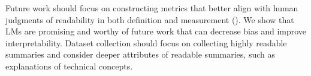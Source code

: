 Future work should focus on constructing metrics that better align with human judgments of readability in both definition and measurement (). We show that LMs are promising and worthy of future work that can decrease bias and improve interpretability. Dataset collection should focus on collecting highly readable summaries and consider deeper attributes of readable summaries, such as explanations of technical concepts. 